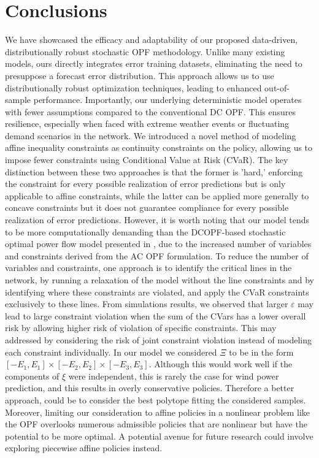 \documentclass[11pt,a4paper,oneside,openany]{book}
\numberwithin{definition}{section}
\numberwithin{theorem}{section}
\numberwithin{problem}{section}
\begin{document}
\chapter{Conclusions}
We have showcased the efficacy and adaptability of our proposed data-driven, distributionally robust stochastic OPF methodology. Unlike many existing models, ours directly integrates error training datasets, eliminating the need to presuppose a forecast error distribution. This approach allows us to use distributionally robust optimization techniques, leading to enhanced out-of-sample performance. Importantly, our underlying deterministic model operates with fewer assumptions compared to the conventional DC OPF. This ensures resilience, especially when faced with extreme weather events or fluctuating demand scenarios in the network. We introduced a novel method of modeling affine inequality constraints as continuity constraints on the policy, allowing us to impose fewer constraints using Conditional Value at Risk (CVaR). The key distinction between these two approaches is that the former is 'hard,' enforcing the constraint for every possible realization of error predictions but is only applicable to affine constraints, while the latter can be applied more generally to concave constraints but it does not guarantee compliance for every possible realization of error predictions.
However, it is worth noting that our model tends to be more computationally demanding than the DCOPF-based stochastic optimal power flow model presented in \cite{DBDRSOPF2}, due to the increased number of variables and constraints derived from the AC OPF formulation.
To reduce the number of variables and constraints, one approach is to identify the critical lines in the network, by running a relaxation of the model without the line constraints and by identifying where these constraints are violated, and apply the CVaR constraints exclusively to these lines. From simulations results, we observed that larger \(\varepsilon\) may lead to large constraint violation when the sum of the CVars has a lower overall risk by allowing higher risk of violation of specific constraints. This may addressed by considering the risk of joint constraint violation instead of modeling each constraint individually. In our model we considered $\Xi$ to be in the form $[-E_1,E_1]\times [-E_2,E_2] \times [-E_3,E_3]$. Although this would work well if the components of $\xi$ were independent, this is rarely the case for wind power prediction, and this results in overly conservative policies. Therefore a better approach, could be to consider the best polytope fitting the considered samples. Moreover, limiting our consideration to affine policies in a nonlinear problem like the OPF overlooks numerous admissible policies that are nonlinear but have the potential to be more optimal. A potential avenue for future research could involve exploring piecewise affine policies instead.
\end{document}
